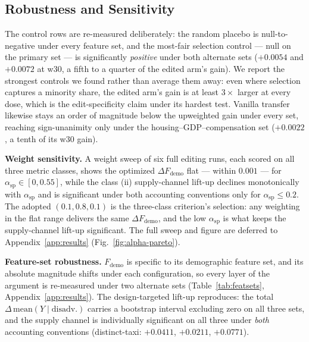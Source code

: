 \subsection{Robustness and Sensitivity}\label{sec:exp-robustness}

The control rows are re-measured deliberately: the random placebo is
null-to-negative under every feature set, and the most-fair selection
control --- null on the primary set --- is significantly \emph{positive}
under both alternate sets ($+0.0054$ and $+0.0072$ at w30, a fifth to a
quarter of the edited arm's gain). We report the strongest controls we
found rather than average them away: even where selection captures a
minority share, the edited arm's gain is at least $3\times$ larger at
every dose, which is the edit-specificity claim under its hardest test.
Vanilla transfer likewise stays an order of magnitude below the upweighted
gain under every set, reaching sign-unanimity only under the
housing--GDP--compensation set ($+0.0022$, a tenth of its w30 gain).

\textbf{Weight sensitivity.} A weight sweep of six full editing runs, 
each scored on all three metric classes, shows the optimized
$\Delta F_{\mathrm{demo}}$ flat --- within $0.001$ --- for
$\alpha_{\mathrm{sp}} \in [0, 0.55]$, while the class (ii) supply-channel
lift-up declines monotonically with $\alpha_{\mathrm{sp}}$ and is significant
under both accounting conventions only for $\alpha_{\mathrm{sp}} \le 0.2$.
The adopted
$(0.1, 0.8, 0.1)$ is the three-class criterion's selection: any weighting in
the flat range delivers the same $\Delta F_{\mathrm{demo}}$, and the low
$\alpha_{\mathrm{sp}}$ is what keeps the supply-channel lift-up
significant. The full sweep and
figure are deferred to Appendix~\ref{app:results}
(Fig.~\ref{fig:alpha-pareto}).

\textbf{Feature-set robustness.} $F_{\mathrm{demo}}$ is specific to its
demographic feature set, and its absolute magnitude shifts under each 
configuration, so every layer of the argument is re-measured under
two alternate sets (Table~\ref{tab:featsets}, Appendix~\ref{app:results}). The
design-targeted lift-up reproduces: the total
$\Delta\,\mathrm{mean}(Y \mid \mathrm{disadv.})$ carries a bootstrap interval
excluding zero on all three sets, and the supply channel is individually
significant on all three under \emph{both} accounting conventions
(distinct-taxi: $+0.0411$, $+0.0211$, $+0.0771$).

